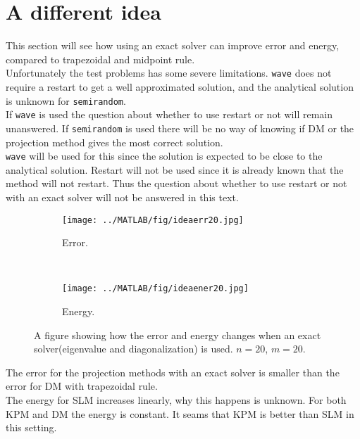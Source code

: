 \section{A different idea} %
This section will see how using an exact solver can improve error and energy, compared to trapezoidal and midpoint rule.\\
Unfortunately the test problems has some severe limitations. \texttt{wave} does not require a restart to get a well approximated solution, and the analytical solution is unknown for \texttt{semirandom}. \\
If \texttt{wave} is used the question about whether to use restart or not will remain unanswered. If \texttt{semirandom} is used there will be no way of knowing if DM or the projection method gives the most correct solution. \\

\texttt{wave} will be used for this since the solution is expected to be close to the analytical solution. Restart will not be used since it is already known that the method will not restart. Thus the question about whether to use restart or not with an exact solver will not be answered in this text. \\

\begin{figure}[H]
        \centering
        \begin{subfigure}[b]{0.45\textwidth}
                \texttt{[image: ../MATLAB/fig/ideaerr20.jpg]}
                \caption{ Error. }
                \label{fig:ideaerr20}
        \end{subfigure}%
        ~
        \begin{subfigure}[b]{0.45\textwidth}
                \texttt{[image: ../MATLAB/fig/ideaener20.jpg]}
                \caption{ Energy. }
                \label{fig:ideaener20}
        \end{subfigure}
        \caption{ A figure showing how the error and energy changes when an exact solver(eigenvalue and diagonalization) is used. $n = 20$, $m = 20$. }
        \label{fig:idea0}
\end{figure}
The error for the projection methods with an exact solver is smaller than the error for DM with trapezoidal rule. \\
The energy for SLM increases linearly, why this happens is unknown. For both KPM and DM the energy is constant. It seams that KPM is better than SLM in this setting. \\

